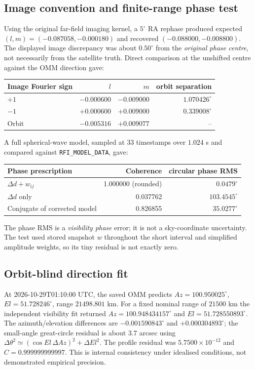 \documentclass[11pt,a4paper]{article}
\begin{document}
\subsection{Image convention and finite-range phase test}
Using the original far-field imaging kernel, a $5^\circ$ RA rephase
produced expected $(l,m)=(-0.087058,-0.000180)$ and recovered
$(-0.088000,-0.008800)$. The displayed image discrepancy was about
$0.50^\circ$ from the \emph{original phase centre}, not necessarily
from the satellite truth. Direct comparison at the unshifted centre
against the OMM direction gave:
\begin{center}\begin{tabular}{lrrr}
\toprule
Image Fourier sign&$l$&$m$&orbit separation\\\midrule
$+1$&$-0.000600$&$-0.009000$&$1.070426^\circ$\\
$-1$&$+0.000600$&$+0.009000$&$0.339008^\circ$\\
Orbit&$-0.005316$&$+0.009077$&--\\\bottomrule
\end{tabular}\end{center}
A full spherical-wave model, sampled at 33 timestamps over
$1.024$ s and compared against \texttt{RFI\_MODEL\_DATA},
gave:
\begin{center}\begin{tabular}{lrr}
\toprule
Phase prescription & Coherence & circular phase RMS\\\midrule
$\Delta d+w_{ij}$ & 1.000000 (rounded) & $0.0479^\circ$\\
$\Delta d$ only & 0.037762 & $103.4545^\circ$\\
Conjugate of corrected model & 0.826855 & $35.0277^\circ$\\\bottomrule
\end{tabular}\end{center}
The phase RMS is a \emph{visibility phase} error; it is not a sky-coordinate
uncertainty. The test used stored snapshot $w$ throughout the short interval
and simplified amplitude weights, so its tiny residual is not exactly zero.
\subsection{Orbit-blind direction fit}
At 2026-10-29T01:10:00 UTC, the saved OMM predicts
$Az=100.950025^\circ$, $El=51.728246^\circ$,
range $21498.801$ km. For a fixed nominal range of $21500$ km
the independent visibility fit returned
$Az=100.948434157^\circ$ and $El=51.728550893^\circ$.
The azimuth/elevation differences are
$-0.001590843^\circ$ and $+0.000304893^\circ$;
the small-angle great-circle residual is about $3.7$ arcsec
using $\Delta\theta^2\simeq(\cos El\,\Delta Az)^2+\Delta El^2$.
The profile residual was $5.7500\times10^{-12}$ and
$C=0.999999999997$. This is internal consistency under idealised
conditions, not demonstrated empirical precision.
\end{document}

